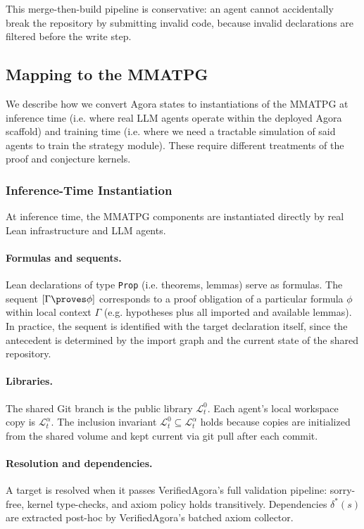 This merge-then-build pipeline is conservative: an agent cannot accidentally break the repository by submitting invalid code, because invalid declarations are filtered before the write step.



\subsection{Mapping to the MMATPG}\label{sec:agora-mapping}
 
We describe how we convert Agora states to instantiations of the MMATPG at inference time (i.e. where real LLM agents operate within the deployed Agora scaffold) and training time (i.e. where we need a tractable simulation of said agents to train the strategy module). These require different treatments of the proof and conjecture kernels.
 
 
\subsubsection{Inference-Time Instantiation}\label{sec:inference-instantiation}
 
At inference time, the MMATPG components are instantiated directly by real Lean infrastructure and LLM agents.
 
\paragraph{Formulas and sequents.}
Lean declarations of type \texttt{Prop} (i.e. theorems, lemmas) serve as formulas. The sequent $[\Gamma\proves\phi]$ corresponds to a proof obligation of a particular formula $\phi$ within local context $\Gamma$ (e.g. hypotheses plus all imported and available lemmas). In practice, the sequent is identified with the target declaration itself, since the antecedent is determined by the import graph and the current state of the shared repository.
 
\paragraph{Libraries.}
The shared Git branch is the public library $\mathcal{L}^0_t$. Each agent's local workspace copy is $\mathcal{L}^\alpha_t$. The inclusion invariant $\mathcal{L}^0_t \subseteq \mathcal{L}^\alpha_t$ holds because copies are initialized from the shared volume and kept current via git pull after each commit.
 
\paragraph{Resolution and dependencies.}
A target is resolved when it passes VerifiedAgora's full validation pipeline: sorry-free, kernel type-checks, and axiom policy holds transitively. Dependencies $\delta^*(s)$ are extracted post-hoc by VerifiedAgora's batched axiom collector.
 
